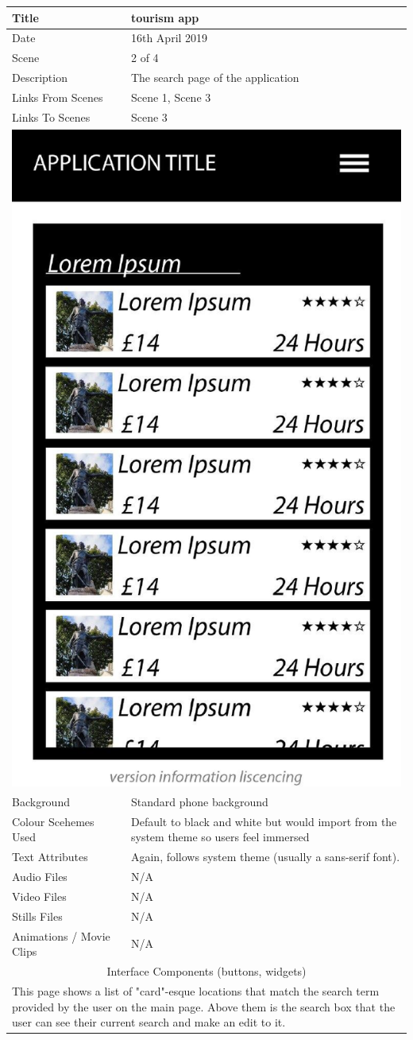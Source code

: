 \hspace{-1cm}
	\centering
	\begin{tabular}{p{4cm}p{10cm}}
		\hline
		Title & tourism app \\
		\hline
		Date & 16th April 2019 \\
		\hline
		Scene & 2 of 4 \\
		\hline
		Description & The search page of the application \\
		\hline
		Links From Scenes & Scene 1, Scene 3 \\
		\hline
		Links To Scenes & Scene 3 \\
		\hline
		\multicolumn{2}{c}{\includegraphics[width=0.5\linewidth]{images/screen1.jpg}} \\
		\hline
		Background & Standard phone background \\
		\hline
		Colour Scehemes Used & Default to black and white but would import from the system theme so users feel immersed \\
		\hline
		Text Attributes & Again, follows system theme (usually a sans-serif font). \\
		\hline
		Audio Files & N/A \\
		\hline
		Video Files & N/A \\
		\hline
		Stills Files & N/A \\
		\hline
		Animations / Movie Clips & N/A \\
		\hline
		\multicolumn{2}{c}{Interface Components (buttons, widgets)} \\
		\hline
		\multicolumn{2}{p{14cm}}{ This page shows a list of "card"-esque locations that match the search term provided by the user on the main page. Above them is the search box that the user can see their current search and make an edit to it.  } \\
		\hline
	\end{tabular}
